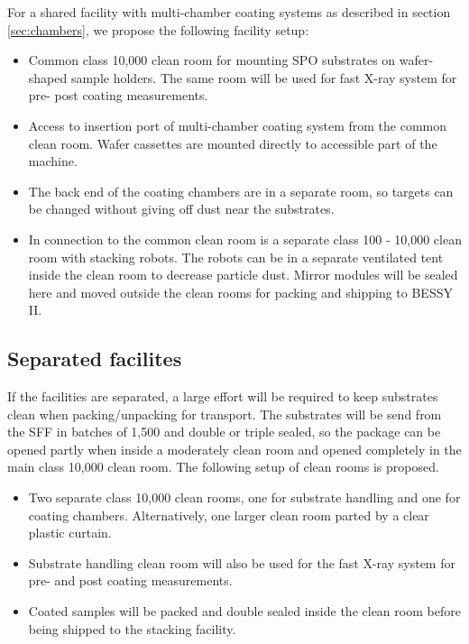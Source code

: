 For a shared facility with multi-chamber coating systems as described in section \ref{sec:chambers}, we propose the following facility setup:

\begin{itemize}
	\item Common class 10,000 clean room for mounting SPO substrates on wafer-shaped sample holders. The same room will be used for fast X-ray system for pre- post coating measurements.
	\item Access to insertion port of multi-chamber coating system from the common clean room. Wafer cassettes are mounted directly to accessible part of the machine.
	\item The back end of the coating chambers are in a separate room, so targets can be changed without giving off dust near the substrates.
	\item In connection to the common clean room is a separate class 100 - 10,000 clean room with stacking robots. The robots can be in a separate ventilated tent inside the clean room to decrease particle dust. Mirror modules will be sealed here and moved outside the clean rooms for packing and shipping to BESSY II.
\end{itemize}

\subsection{Separated facilites}
If the facilities are separated, a large effort will be required to keep substrates clean when packing/unpacking for transport. The substrates will be send from the SFF in batches of 1,500 and double or triple sealed, so the package can be opened partly when inside a moderately clean room and opened completely in the main class 10,000 clean room. The following setup of clean rooms is proposed.

\begin{itemize}
	\item Two separate class 10,000 clean rooms, one for substrate handling and one for coating chambers. Alternatively, one larger clean room parted by a clear plastic curtain.
	\item Substrate handling clean room will also be used for the fast X-ray system for pre- and post coating measurements.
	\item Coated samples will be packed and double sealed inside the clean room before being shipped to the stacking facility.
\end{itemize}

